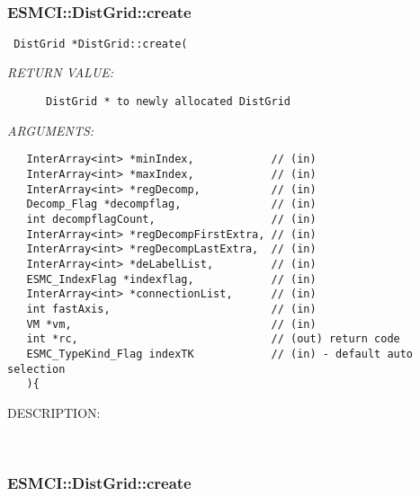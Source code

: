    
 
\mbox{}\hrulefill\
 
\subsubsection [ESMCI::DistGrid::create] {ESMCI::DistGrid::create}


  
\begin{verbatim} DistGrid *DistGrid::create(\end{verbatim}{\em RETURN VALUE:}
\begin{verbatim}      DistGrid * to newly allocated DistGrid\end{verbatim}{\em ARGUMENTS:}
\begin{verbatim}   InterArray<int> *minIndex,            // (in)
   InterArray<int> *maxIndex,            // (in)
   InterArray<int> *regDecomp,           // (in)
   Decomp_Flag *decompflag,              // (in)
   int decompflagCount,                  // (in)
   InterArray<int> *regDecompFirstExtra, // (in)
   InterArray<int> *regDecompLastExtra,  // (in)
   InterArray<int> *deLabelList,         // (in)
   ESMC_IndexFlag *indexflag,            // (in)
   InterArray<int> *connectionList,      // (in)
   int fastAxis,                         // (in)
   VM *vm,                               // (in)
   int *rc,                              // (out) return code
   ESMC_TypeKind_Flag indexTK            // (in) - default auto selection
   ){\end{verbatim}
{\sf DESCRIPTION:\\ }


   
 
\mbox{}\hrulefill\
 
\subsubsection [ESMCI::DistGrid::create] {ESMCI::DistGrid::create}


